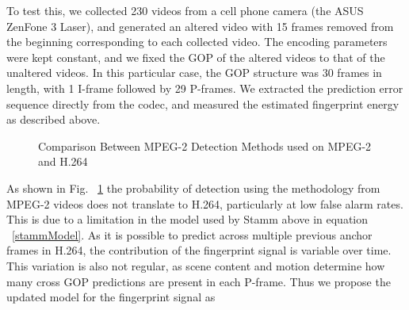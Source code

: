 To test this, we collected 230 videos from a cell phone camera (the ASUS ZenFone 3 Laser), and generated an altered video with 15 frames removed from the beginning corresponding to each collected video. The encoding parameters were kept constant, and we fixed the GOP of the altered videos to that of the unaltered videos. In this particular case, the GOP structure was 30 frames in length, with 1 I-frame followed by 29 P-frames. We extracted the prediction error sequence directly from the codec, and measured the estimated fingerprint energy as described above.

\begin{figure}[tbp]%
  \centering
  \qquad
\caption{Comparison Between MPEG-2 Detection Methods used on MPEG-2 and H.264}%
\label{oldMethodCompare}%
\end{figure}


As shown in Fig. ~\ref{oldMethodCompare} the probability of detection using the methodology from MPEG-2 videos does not translate to H.264, particularly at low false alarm rates. This is due to a limitation in the model used by Stamm above in equation ~\ref{stammModel}. As it is possible to predict across multiple previous anchor frames in H.264, the contribution of the fingerprint signal is variable over time. This variation is also not regular, as scene content and motion determine how many cross GOP predictions are present in each P-frame. Thus we propose the updated model for the fingerprint signal as

